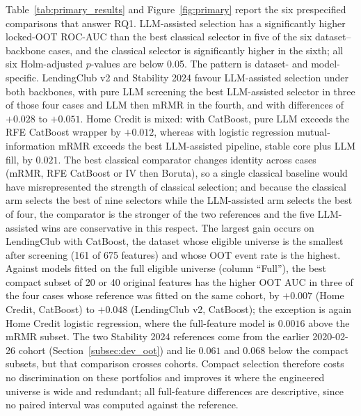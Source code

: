 \documentclass[final,5p,twocolumn]{elsarticle}
\begin{document}
Table~\ref{tab:primary_results} and Figure~\ref{fig:primary} report the six prespecified comparisons that answer RQ1. LLM-assisted selection has a significantly higher locked-OOT ROC-AUC than the best classical selector in five of the six dataset--backbone cases, and the classical selector is significantly higher in the sixth; all six Holm-adjusted $p$-values are below 0.05. The pattern is dataset- and model-specific. LendingClub v2 and Stability 2024 favour LLM-assisted selection under both backbones, with pure LLM screening the best LLM-assisted selector in three of those four cases and LLM then mRMR in the fourth, and with differences of $+0.028$ to $+0.051$. Home Credit is mixed: with CatBoost, pure LLM exceeds the RFE CatBoost wrapper by $+0.012$, whereas with logistic regression mutual-information mRMR exceeds the best LLM-assisted pipeline, stable core plus LLM fill, by $0.021$. The best classical comparator changes identity across cases (mRMR, RFE CatBoost or IV then Boruta), so a single classical baseline would have misrepresented the strength of classical selection; and because the classical arm selects the best of nine selectors while the LLM-assisted arm selects the best of four, the comparator is the stronger of the two references and the five LLM-assisted wins are conservative in this respect. The largest gain occurs on LendingClub with CatBoost, the dataset whose eligible universe is the smallest after screening (161 of 675 features) and whose OOT event rate is the highest. Against models fitted on the full eligible universe (column ``Full''), the best compact subset of 20 or 40 original features has the higher OOT AUC in three of the four cases whose reference was fitted on the same cohort, by $+0.007$ (Home Credit, CatBoost) to $+0.048$ (LendingClub v2, CatBoost); the exception is again Home Credit logistic regression, where the full-feature model is $0.0016$ above the mRMR subset. The two Stability 2024 references come from the earlier 2020-02-26 cohort (Section~\ref{subsec:dev_oot}) and lie $0.061$ and $0.068$ below the compact subsets, but that comparison crosses cohorts. Compact selection therefore costs no discrimination on these portfolios and improves it where the engineered universe is wide and redundant; all full-feature differences are descriptive, since no paired interval was computed against the reference.
\end{document}

